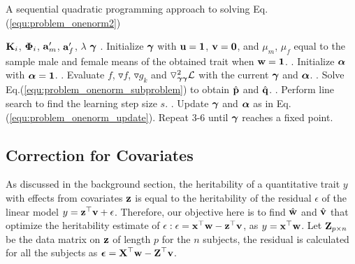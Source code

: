 \documentclass[10pt,letterpaper]{article}
\newcommand{\matrx}[1]{\ensuremath\boldsymbol{\rm #1}}
\newcommand{\vect}[1]{\ensuremath\boldsymbol{\rm #1}}
\begin{document}
\begin{algorithm}[tb]
   \caption{A sequential quadratic programming approach to solving Eq.(\ref{equ:problem_onenorm2})}
   \label{alg:sqp}
\begin{algorithmic}
    $\matrx K_i$, $\matrx \Phi_i$, $\vect a'_m$, $\vect a'_f$, $\lambda$
    $\vect \gamma$
   . Initialize $\vect \gamma$ with $\vect u = \vect 1$, $\vect v = \vect 0$, and $\mu_m$, $\mu_f$ equal to the sample male and female means of the obtained trait when $\vect w= \vect 1$.
   . Initialize $\vect \alpha$ with $\vect \alpha = \vect 1$.
   . Evaluate $f$, $\triangledown f$, $\triangledown g_k$ and $\triangledown^2_{\vect \gamma \vect \gamma}\mathcal{L}$ with the current $\vect \gamma$ and $\vect \alpha$.
   . Solve Eq.(\ref{equ:problem_onenorm_subproblem}) to obtain $\hat{\vect p}$ and $\hat{\vect q}$.
   . Perform line search to find the learning step size $s$. 
   . Update $\vect \gamma$ and $\vect \alpha$ as in Eq.(\ref{equ:problem_onenorm_update}).
   \STATE Repeat 3-6 until $\vect \gamma$ reaches a fixed point.
\end{algorithmic}
\end{algorithm}

\subsection*{Correction for Covariates} \label{sec:correcting}
As discussed in the background section, the heritability of a quantitative trait $y$ with effects from covariates $\vect z$ is equal to the heritability of the residual $\epsilon$ of the linear model $y = \vect z^\top \vect v + \epsilon$. Therefore, our objective here is to find $\hat{\vect w}$ and $\hat{\vect v}$ that optimize the heritability estimate of $\epsilon: \epsilon = \vect x^\top \vect w - \vect z^\top \vect v$, as $y=\vect x^\top \vect w$. Let $\matrx Z_{p\times n}$ be the data matrix on $\vect z$ of length $p$ for the $n$ subjects, the residual is calculated for all the subjects as $\vect \epsilon = \matrx X^\top \vect w - \matrx Z^\top \vect v$.
\end{document}
